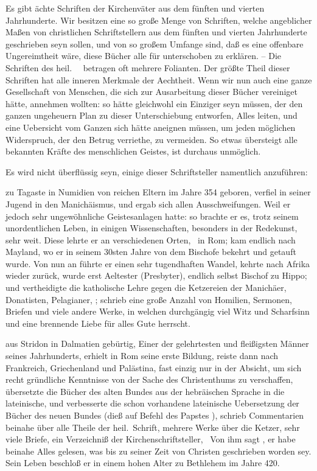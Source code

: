 \begin{aufza}
\item Es gibt ächte Schriften der Kirchenväter aus dem fünften und vierten Jahrhunderte. Wir besitzen eine so große Menge von Schriften, welche angeblicher Maßen von christlichen Schriftstellern aus dem fünften und vierten Jahrhunderte geschrieben seyn sollen, und von so großem Umfange sind, daß es eine offenbare Ungereimtheit wäre, diese Bücher alle für unterschoben zu erklären. -- Die Schriften des heil.\  \uA\ betragen oft mehrere Folianten. Der größte Theil dieser Schriften hat alle inneren Merkmale der Aechtheit. Wenn wir nun auch eine ganze Gesellschaft von Menschen, die sich zur Ausarbeitung dieser Bücher vereiniget hätte, annehmen wollten: so hätte gleichwohl ein Einziger seyn müssen, der den ganzen ungeheuern Plan zu dieser Unterschiebung entworfen, Alles leiten, und eine Uebersicht vom Ganzen sich hätte aneignen müssen, um jeden möglichen Widerspruch, der den Betrug verriethe, zu vermeiden. So etwas übersteigt alle bekannten Kräfte des menschlichen Geistes, ist durchaus unmöglich.
\item Es wird nicht überflüssig seyn, einige dieser Schriftsteller namentlich anzuführen:~
\begin{aufzb}
\item {} zu Tagaste in Numidien von reichen Eltern im Jahre 354 geboren, verfiel in seiner Jugend in den Manichäismus, und ergab sich allen Ausschweifungen. Weil er jedoch sehr ungewöhnliche Geistesanlagen hatte: so brachte er es, trotz seinem unordentlichen Leben, in einigen Wissenschaften, besonders in der Redekunst, sehr weit. Diese lehrte er an verschiedenen Orten, \zB\ in Rom; kam endlich nach Mayland, wo er in seinem 30sten Jahre von dem Bischofe  bekehrt und getauft wurde. Von nun an führte er einen sehr tugendhaften Wandel, kehrte nach Afrika wieder zurück, wurde erst Aeltester (Presbyter), endlich selbst Bischof zu Hippo; und vertheidigte die katholische Lehre gegen die Ketzereien der Manichäer, Donatisten, Pelagianer, \uA ; schrieb eine große Anzahl von Homilien, Sermonen, Briefen und viele andere Werke, in welchen durchgängig viel Witz und Scharfsinn und eine brennende Liebe für alles Gute herrscht.
\item {} aus Stridon in Dalmatien gebürtig, Einer der gelehrtesten und fleißigsten Männer seines Jahrhunderts, erhielt in Rom seine erste Bildung, reiste dann nach Frankreich, Griechenland und Palästina, fast einzig nur in der Absicht, um sich recht gründliche Kenntnisse von der Sache des Christenthums zu verschaffen, übersetzte die Bücher des alten Bundes aus der hebräischen Sprache in die lateinische, und verbesserte die schon vorhandene lateinische Uebersetzung der Bücher des neuen Bundes (dieß auf Befehl des Papstes ), schrieb Commentarien beinahe über alle Theile der heil.\ Schrift, mehrere Werke über die Ketzer, sehr viele Briefe, ein Verzeichniß der Kirchenschriftsteller, \umA\  Von ihm sagt , er habe beinahe Alles gelesen, was bis zu seiner Zeit von Christen geschrieben worden sey. Sein Leben beschloß er in einem hohen Alter zu Bethlehem im Jahre 420.

\end{aufzb}
\end{aufza}
